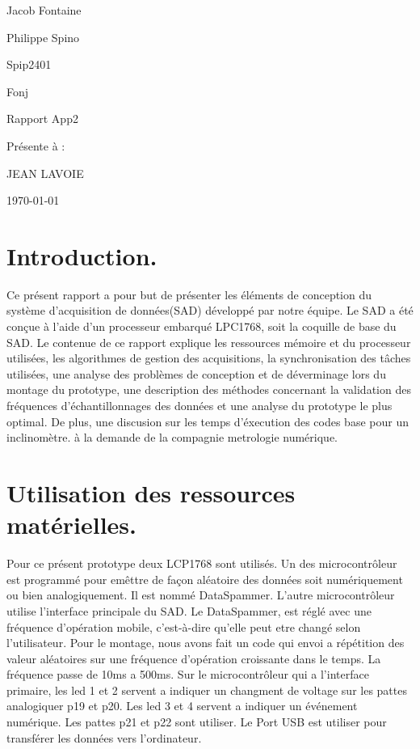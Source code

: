 \documentclass[12pt]{article}
\begin{document}
\begin{titlepage}
	\centering
	{\LARGE Jacob Fontaine \par
	 \LARGE Philippe Spino \par}
	\vspace{1cm}
	\small Spip2401\par
	\small Fonj\par 
	\vspace{3cm}
	{\Large Rapport App2\par}
	\vspace{5cm}
	{\Large Présente à :\par JEAN LAVOIE\par}
	\vspace{4cm}
	\vfill
	{\large \today\par}
\end{titlepage}

\newpage
\tableofcontents
\newpage
\section{Introduction.}
Ce présent rapport a pour but de présenter les éléments de conception du système d'acquisition de données(SAD) développé par notre équipe. Le SAD a été conçue à l'aide d'un processeur embarqué LPC1768, soit la coquille de base du SAD. Le contenue de ce rapport explique les ressources mémoire et du processeur utilisées, les algorithmes de gestion des acquisitions, la synchronisation des tâches utilisées, une analyse des problèmes de conception et de déverminage lors du montage du prototype, une description des méthodes concernant la validation des fréquences d'échantillonnages des données et une analyse du prototype le plus optimal. De plus, une discusion sur les temps d'éxecution des codes base pour un inclinomètre. à la demande de la compagnie metrologie numérique.
\section{Utilisation des ressources matérielles.}
\noindent
Pour ce présent prototype deux LCP1768 sont utilisés. Un des microcontrôleur est programmé pour emêttre de façon aléatoire des données soit numériquement ou bien analogiquement. Il est nommé DataSpammer. L'autre microcontrôleur utilise l'interface principale du SAD. Le DataSpammer, est réglé avec une fréquence d'opération mobile, c'est-à-dire qu'elle peut etre changé selon l'utilisateur. Pour le montage, nous avons fait un code qui envoi a répétition des valeur aléatoires sur une fréquence d'opération croissante dans le temps. La fréquence passe de 10ms a 500ms. Sur le microcontrôleur qui a l'interface primaire, les led 1 et 2 servent a indiquer un changment de voltage sur les pattes analogiquer p19 et p20. Les led 3 et 4 servent a indiquer un événement numérique. Les pattes p21 et p22 sont utiliser. Le Port USB est utiliser pour transférer les données vers l'ordinateur.
\end{document}
